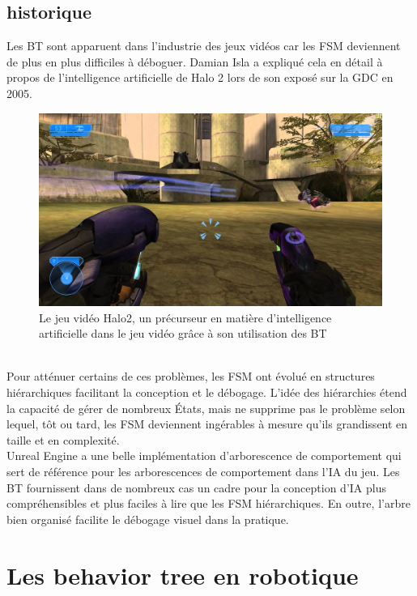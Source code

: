 \documentclass[titlepage]{article}
\begin{document}
		\subsection{historique}
			Les BT sont apparuent dans l'industrie des jeux vidéos car les FSM deviennent de plus en plus difficiles à déboguer. Damian Isla a expliqué cela en détail à propos de l’intelligence artificielle de Halo 2 lors de son exposé sur la GDC en 2005. \cite{gdc_2005}
			\\
			\begin{figure}[h!]
				\includegraphics[width=\linewidth]{img/halo2.jpg}
				\caption{Le jeu vidéo Halo2, un précurseur en matière d'intelligence artificielle dans le jeu vidéo grâce à son utilisation des BT \cite{wikipedia_halo}}
				\label{fig:BT1}
			\end{figure}
			\\
			Pour atténuer certains de ces problèmes, les FSM ont évolué en structures hiérarchiques facilitant la conception et le débogage. L'idée des hiérarchies étend la capacité de gérer de nombreux États, mais ne supprime pas le problème selon lequel, tôt ou tard, les FSM deviennent ingérables à mesure qu'ils grandissent en taille et en complexité.
			\\
			Unreal Engine a une belle implémentation d'arborescence de comportement qui sert de référence pour les arborescences de comportement dans l'IA du jeu.
			Les BT fournissent dans de nombreux cas un cadre pour la conception d'IA plus compréhensibles et plus faciles à lire que les FSM hiérarchiques. En outre, l’arbre bien organisé facilite le débogage visuel dans la pratique.
		

	
	\clearpage
	\section{Les behavior tree en robotique}
\end{document}
